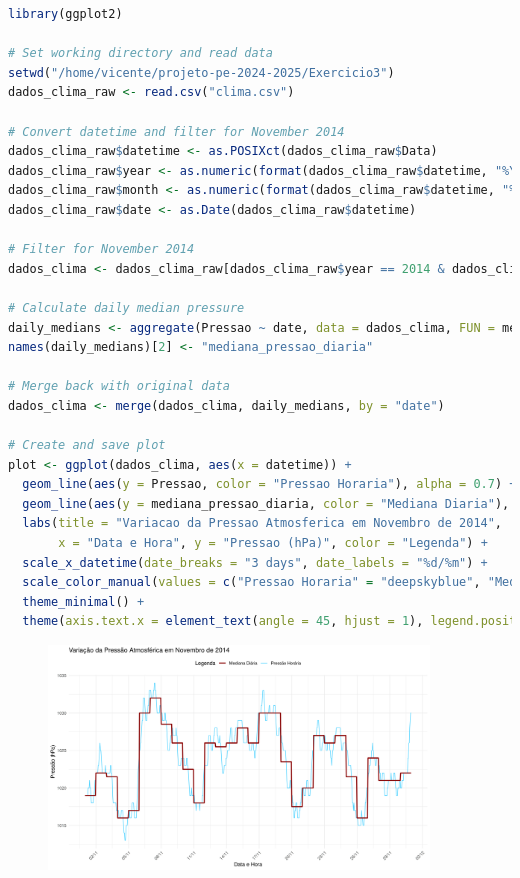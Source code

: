 \documentclass[11pt,a4paper]{article}
\begin{document}
\begin{lstlisting}[language=R]
library(ggplot2)

# Set working directory and read data
setwd("/home/vicente/projeto-pe-2024-2025/Exercicio3")
dados_clima_raw <- read.csv("clima.csv")

# Convert datetime and filter for November 2014
dados_clima_raw$datetime <- as.POSIXct(dados_clima_raw$Data)
dados_clima_raw$year <- as.numeric(format(dados_clima_raw$datetime, "%Y"))
dados_clima_raw$month <- as.numeric(format(dados_clima_raw$datetime, "%m"))
dados_clima_raw$date <- as.Date(dados_clima_raw$datetime)

# Filter for November 2014
dados_clima <- dados_clima_raw[dados_clima_raw$year == 2014 & dados_clima_raw$month == 11, ]

# Calculate daily median pressure
daily_medians <- aggregate(Pressao ~ date, data = dados_clima, FUN = median, na.rm = TRUE)
names(daily_medians)[2] <- "mediana_pressao_diaria"

# Merge back with original data
dados_clima <- merge(dados_clima, daily_medians, by = "date")

# Create and save plot
plot <- ggplot(dados_clima, aes(x = datetime)) +
  geom_line(aes(y = Pressao, color = "Pressao Horaria"), alpha = 0.7) +
  geom_line(aes(y = mediana_pressao_diaria, color = "Mediana Diaria"), linewidth = 1) +
  labs(title = "Variacao da Pressao Atmosferica em Novembro de 2014",
       x = "Data e Hora", y = "Pressao (hPa)", color = "Legenda") +
  scale_x_datetime(date_breaks = "3 days", date_labels = "%d/%m") +
  scale_color_manual(values = c("Pressao Horaria" = "deepskyblue", "Mediana Diaria" = "red4")) +
  theme_minimal() +
  theme(axis.text.x = element_text(angle = 45, hjust = 1), legend.position = "top")
\end{lstlisting}

\begin{figure}[htbp]
    \centering
    \includegraphics[width=0.9\textwidth]{clima_pressao_nov2014.png}
\end{figure}
\end{document}
